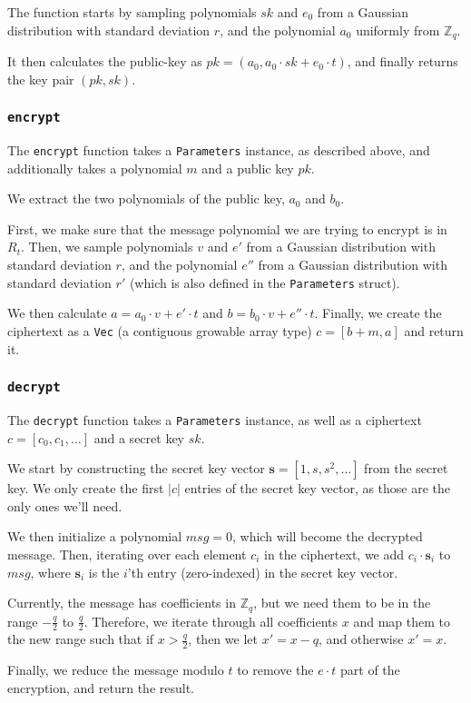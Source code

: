 \documentclass{article}
\begin{document}
The function starts by sampling polynomials $sk$ and $e_0$ from a Gaussian distribution with standard deviation $r$, and the polynomial $a_0$ uniformly from $\mathbb{Z}_q$.

It then calculates the public-key as $pk = (a_0, a_0 \cdot sk + e_0 \cdot t)$, and finally returns the key pair $(pk, sk)$.

\subsubsection{\lstinline{encrypt}}

The \lstinline{encrypt} function takes a \lstinline{Parameters} instance, as described above, and additionally takes a polynomial $m$ and a public key $pk$.

We extract the two polynomials of the public key, $a_0$ and $b_0$.

First, we make sure that the message polynomial we are trying to encrypt is in $R_t$.
Then, we sample polynomials $v$ and $e'$ from a Gaussian distribution with standard deviation $r$, and the polynomial $e''$ from a Gaussian distribution with standard deviation $r'$ (which is also defined in the \lstinline{Parameters} struct).

We then calculate $a = a_0 \cdot v + e' \cdot t$ and $b = b_0 \cdot v + e'' \cdot t$.
Finally, we create the ciphertext as a \lstinline{Vec} (a contiguous growable array type) $c = [b + m, a]$ and return it.

\subsubsection{\lstinline{decrypt}}

The \lstinline{decrypt} function takes a \lstinline{Parameters} instance, as well as a ciphertext $c = [c_0, c_1, \dots]$ and a secret key $sk$.

We start by constructing the secret key vector $\mathbf{s} = [1, s, s^2, \dots]$ from the secret key.
We only create the first $|c|$ entries of the secret key vector, as those are the only ones we'll need.

We then initialize a polynomial $msg = 0$, which will become the decrypted message.
Then, iterating over each element $c_i$ in the ciphertext, we add $c_i \cdot \mathbf{s}_i$ to $msg$, where $\mathbf{s}_i$ is the $i$'th entry (zero-indexed) in the secret key vector.

Currently, the message has coefficients in $\mathbb{Z}_q$, but we need them to be in the range $-\frac{q}{2}$ to $\frac{q}{2}$.
Therefore, we iterate through all coefficients $x$ and map them to the new range such that if $x > \frac{q}{2}$, then we let $x' = x - q$, and otherwise $x' = x$.

Finally, we reduce the message modulo $t$ to remove the $e \cdot t$ part of the encryption, and return the result.
\end{document}
